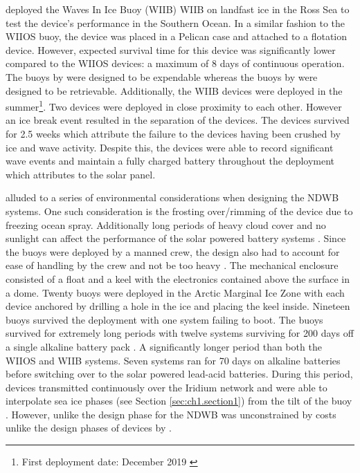 \textcite{rabault2019open} deployed the Waves In Ice Buoy (WIIB) WIIB on landfast ice in the Ross Sea \cite{rabault2020development} to test the device's performance in the Southern Ocean. In a similar fashion to the WIIOS buoy, the device was placed in a Pelican case and attached to a flotation device. However, expected survival time for this device was significantly lower compared to the WIIOS devices: a maximum of 8 days \cite{rabault2019open} of continuous operation. The buoys by \textcite{kohout2015device} were designed to be expendable whereas the buoys by \textcite{rabault2019open} were designed to be retrievable. Additionally, the WIIB devices were deployed in the summer\footnote{First deployment date: December 2019 \cite{rabault2019open}}. Two devices were deployed in close proximity to each other. However an ice break event resulted in the separation of the devices. The devices survived for 2.5 weeks \cite{rabault2019open} which \textcite{rabault2019open} attribute the failure to the devices having been crushed by ice and wave activity. Despite this, the devices were able to record significant wave events and maintain a fully charged battery throughout the deployment which \textcite{rabault2019open} attributes to the solar panel. 

\par \textcite{doble2017robust} alluded to a series of environmental considerations when designing the NDWB systems. One such consideration is the frosting over/rimming of the device due to freezing ocean spray. Additionally long periods of heavy cloud cover and no sunlight can affect the performance of the solar powered battery systems \cite{doble2017robust,lever2006solar}. Since the buoys were deployed by a manned crew, the design also had to account for ease of handling by the crew and not be too heavy \cite{doble2017robust}. The mechanical enclosure consisted of a float and a keel with the electronics contained above the surface in a dome. Twenty buoys were deployed in the Arctic Marginal Ice Zone with each device anchored by drilling a hole in the ice and placing the keel inside. Nineteen buoys survived the deployment with one system failing to boot. The buoys survived for extremely long periods with twelve systems surviving for 200 days off a single alkaline battery pack \cite{doble2017robust}. A significantly longer period than both the WIIOS and WIIB systems. Seven systems ran for 70 days on alkaline batteries before switching over to  the solar powered lead-acid batteries. During this period, devices transmitted continuously over the Iridium network and were able to interpolate sea ice phases (see Section \ref{sec:ch1.section1}) from the tilt of the buoy \cite{doble2017robust}. However, unlike the design phase for the NDWB was unconstrained by costs unlike the design phases of devices by \textcite{rabault2019open,planck2019evolution,kohout2015device}. 

